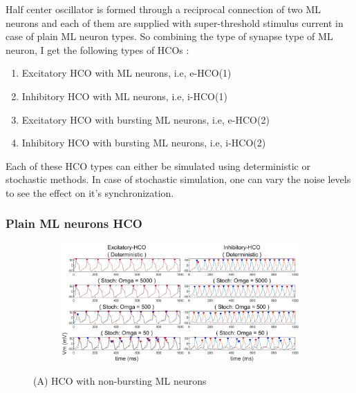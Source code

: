 \documentclass[
]{article}
\providecommand{\tightlist}{%
  \setlength{\itemsep}{0pt}\setlength{\parskip}{0pt}}
\begin{document}
Half center oscillator is formed through a reciprocal connection of two ML neurons and each of them are supplied with super-threshold stimulus current in case of plain ML neuron types. So combining the type of synapse type of ML neuron, I get the following types of HCOs :

\begin{enumerate}
\def\labelenumi{\arabic{enumi}.}
\tightlist
\item
  Excitatory HCO with ML neurons, i.e, e-HCO(1)
\item
  Inhibitory HCO with ML neurons, i.e, i-HCO(1)
\item
  Excitatory HCO with bursting ML neurons, i.e, e-HCO(2)
\item
  Inhibitory HCO with bursting ML neurons, i.e, i-HCO(2)
\end{enumerate}

Each of these HCO types can either be simulated using deterministic or stochastic methods. In case of stochastic simulation, one can vary the noise levels to see the effect on it's synchronization.

\hypertarget{plain-ml-neurons-hco}{%
\subsubsection{Plain ML neurons HCO}\label{plain-ml-neurons-hco}}

\begin{figure}
  \captionsetup[subfigure]{labelformat=empty} \centering
  \begin{subfigure}[b]{\textwidth}
      \caption{} \label{fig:fig3nb}
      \includegraphics[width=\textwidth]{figs/F3_A_HCO_Omega_NB.png}
  \end{subfigure}
  \vspace{-0.5cm}
  \caption{(A) HCO with non-bursting ML neurons}
\end{figure}
\end{document}
